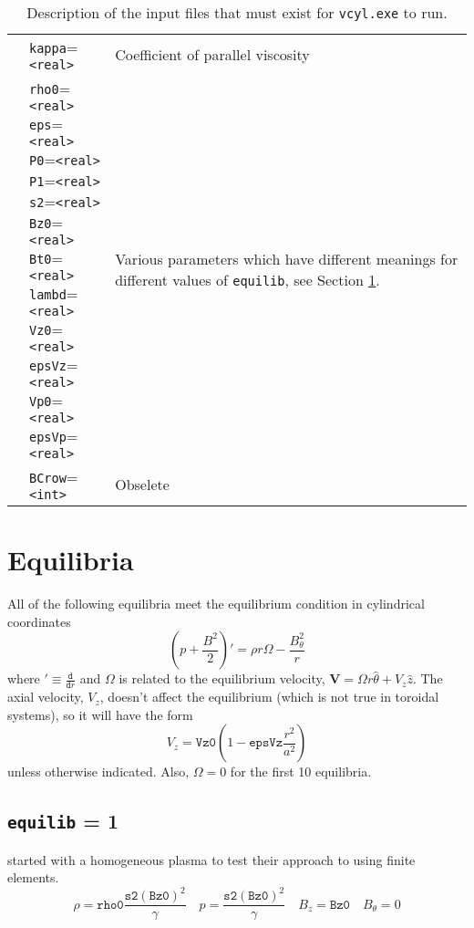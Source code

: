 \documentclass[letterpaper]{article}
\newcommand{\ttt}[1]{\texttt{#1}}
\newcommand{\typ}[1]{\ttt{<#1>}}
\newcommand{\typi}{\typ{int}}
\newcommand{\typr}{\typ{real}}
\newcommand{\tttr}[1]{\ttt{#1}=\typr}
\begin{document}
\begin{table}
\begin{tabular}{|c|l|p{2.3in}|}
    & \tttr{kappa} & Coefficient of parallel viscosity \\
    \cline{2-3} 
    & \parbox[t]{1in}{\tttr{rho0} \\ \tttr{eps} \\ \tttr{P0} \\ \tttr{P1} \\ \tttr{s2} \\ \tttr{Bz0} \\ \tttr{Bt0} \\ \tttr{lambd} \\ \tttr{Vz0} \\ \tttr{epsVz} \\ \tttr{Vp0} \\ \tttr{epsVp} }& Various parameters which have different meanings for different values of \ttt{equilib}, see Section \ref{equilib}. \\ 
    & \parbox[t]{1in}{\ttt{BCrow}=\typi} & Obselete \\
    \hline
  \end{tabular}
  \caption{Description of the input files that must exist for \ttt{vcyl.exe} to run.\label{files}}
\end{table}
\section{Equilibria}\label{equilib}
All of the following equilibria meet the equilibrium condition in cylindrical coordinates
\begin{equation}
 \left (p+\frac{B^2}{2}\right)'=\rho r \Omega-\frac{B_{\theta}^2}{r}
\end{equation}
where $'\equiv \frac{\texttt{d}}{\texttt{d}r}$ and $\Omega$ is related to the equilibrium velocity, $\mathbf{V}=\Omega r \hat{\theta}+V_z \hat{z}$.  The axial velocity, $V_z$, doesn't affect the equilibrium (which is not true in toroidal systems), so it will have the form
\begin{equation}
V_z = \texttt{Vz0}\left ( 1-\texttt{epsVz}\frac{r^2}{a^2} \right )
\end{equation}
unless otherwise indicated.  Also, $\Omega=0$ for the first 10 equilibria.

\subsection{\ttt{equilib} = 1}
\citet{Appert1975} started with a homogeneous plasma to test their approach to using finite elements. 
\begin{equation}
\rho=\texttt{rho0} \frac{\texttt{s2} (\texttt{Bz0})^2}{\gamma} \quad p=\frac{\texttt{s2} (\texttt{Bz0})^2}{\gamma} \quad B_z=\texttt{Bz0} \quad B_{\theta}=0 
\end{equation} 
\end{document}
